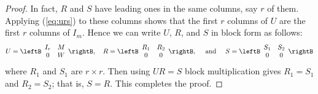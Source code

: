 \begin{proof}
In fact, $R$ and $S$ have leading ones in the same columns, say $r$ of them. Applying (\ref{eq:urs}) to these columns shows that the first $r$ columns of $U$ are the first $r$ columns of $I_{m}$. Hence we can write $U$, $R$, and $S$ in block form as follows:
\begin{equation*}
U = \leftB \begin{array}{cc}
I_{r} & M \\
0 & W
\end{array} \rightB, \quad
R = \leftB \begin{array}{cc}
R_{1} & R_{2} \\
0 & 0
\end{array} \rightB, \quad \mbox{ and } \quad
S = \leftB \begin{array}{cc}
S_{1} & S_{2} \\
0 & 0
\end{array} \rightB
\end{equation*}
where $R_{1}$ and $S_{1}$ are $r \times r$. Then using $UR=S$ block multiplication gives $R_{1} = S_{1}$ and $R_{2} = S_{2}$; that is, $S = R$. This completes the proof.
\end{proof}
